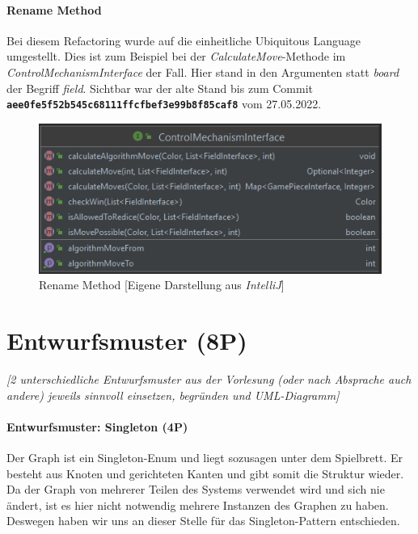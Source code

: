 \newpage
\subsubsection{Rename Method}
\noindent Bei diesem Refactoring wurde auf die einheitliche Ubiquitous Language umgestellt. Dies ist zum Beispiel bei der \emph{CalculateMove}-Methode im \emph{ControlMechanismInterface} der Fall. Hier stand in den Argumenten statt \emph{board} der Begriff \emph{field}. Sichtbar war der alte Stand bis zum Commit \textbf{\texttt{aee0fe5f52b545c68111ffcfbef3e99b8f85caf8}} vom 27.05.2022.

\begin{figure}[htbp]
\centering
\centerline{\includegraphics[scale=.6]{renamemethod}}
\caption{Rename Method [Eigene Darstellung aus \emph{IntelliJ}]}
\label{fig:renamemethod}
\end{figure}

\newpage
\titlespacing*{\chapter}{0pt}{-30mm}{10pt}
  
\chapter{Entwurfsmuster (8P)}
\pagestyle{scrheadings}
\clearscrheadfoot
{}
\setcounter{page}{39}
\ofoot[\pagemark]{\pagemark}
\onehalfspacing

\emph{[2 unterschiedliche Entwurfsmuster aus der Vorlesung (oder nach Absprache auch andere) jeweils
sinnvoll einsetzen, begründen und UML-Diagramm]}

\subsubsection{Entwurfsmuster: Singleton (4P)}
\noindent Der Graph ist ein Singleton-Enum und liegt sozusagen unter dem Spielbrett. Er besteht aus Knoten und gerichteten Kanten und gibt somit die Struktur wieder. Da der Graph von mehrerer Teilen des Systems verwendet wird und sich nie ändert, ist es hier nicht notwendig mehrere Instanzen des Graphen zu haben. Deswegen haben wir uns an dieser Stelle für das Singleton-Pattern entschieden.

